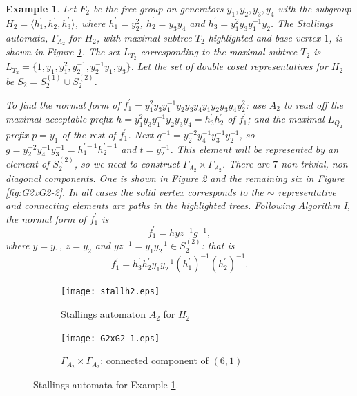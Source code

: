 \documentclass[a4paper,12pt]{article}
\newcommand{\G}{\Gamma }
\newtheorem{exam}[theorem]{Example}
\newenvironment{example}{\begin{exam} \rm}{\end{exam}}
\numberwithin{equation}{section}
\numberwithin{figure}{section}
\newcommand{\la}{\langle}
\newcommand{\ra}{\rangle}
\begin{document}
\begin{example}\label{ex:f_2}
Let $F_2$ be the free group on generators
$y_1,y_2,y_3,y_4$ with the subgroup $H_2 = \la h_1^{\prime},
h_2^{\prime},h_3^{\prime}\ra$, where
$h_1^{\prime}=y_2^2$,
$h_2^{\prime}=y_3y_4$ and
$h_3^{\prime}=y_1^2y_3y_1^{-1}y_2$.
The Stallings automata, $\G_{A_2}$ for $H_2$,
with maximal subtree $T_2$ highlighted and base vertex $1$, is shown
in Figure \ref{fig:stallh2}.
The set $L_{T_2}$ corresponding to the maximal subtree  $T_2$ is
 $L_{T_2}=
\{1, y_1, y_1^2,
y_2^{-1}, y_2^{-1}y_1, y_3 \}$.
Let the set of double coset representatives for $H_2$ be $S_2=S_2^{(1)}
\cup S_2^{(2)}$.

To find the normal form of $f_1^\prime=y_1^2y_3y_1^{-1}y_2y_3y_4y_1y_2
y_3y_4y_2^2$: use ${A_2}$ to read off the maximal acceptable
prefix $h= y_1^2y_3y_1^{-1}y_2y_3y_4=h_3^\prime h_2^\prime$ of $f_1^\prime$; and  the maximal
$L_{Q_2}$-prefix $p=y_1$ of the rest of $f_1^\prime$.  Next $q^{-1}=
y_2^{-2}y_4^{-1}y_3^{-1}y_2^{-1}$, so $g=y_2^{-2}y_4^{-1}y_3^{-1}
=h_1^{\prime -1}h_2^{\prime -1}$
and $t=y_2^{-1}$. This element will be represented by an element
of $S_2^{(2)}$, so we need to construct $\G_{A_2}\times \G_{A_2}$.
There are $7$  non-trivial, non-diagonal components. One is shown
in Figure \ref{fig:G2xG2-1} and the remaining
six in Figure \ref{fig:G2xG2-2}. In all cases the solid vertex
corresponds to the $\sim$ representative and connecting elements
are paths in the highlighted trees. Following Algorithm I, the
normal form of $f_1^\prime$ is 
\[f_1^\prime=h yz^{-1} g^{-1},\]
where $y=y_1$, $z=y_2$ and $yz^{-1}=y_1y_2^{-1}\in S_2^{(2)}$: that is
\[f_1^\prime=h^\prime_3h_2^\prime y_1y_2^{-1} (h_1^\prime)^{-1}(h_2^\prime)^{-1}.\]
\end{example}
\begin{figure}
\begin{center}




\begin{subfigure}[b]{.3\columnwidth}
\texttt{[image: stallh2.eps]}
\caption{Stallings automaton $A_2$ for $H_2$}
\label{fig:stallh2}
\end{subfigure}
\hspace{25mm}
\begin{subfigure}[b]{.3\columnwidth}
\texttt{[image: G2xG2-1.eps]}
\caption{$\G_{A_2}\times \G_{A_2}$: connected component of $(6,1)$}
\label{fig:G2xG2-1}
\end{subfigure}
\end{center}
\caption{Stallings automata for Example \ref{ex:f_2}.}\label{fig:stallagain}
\end{figure}
\end{document}
